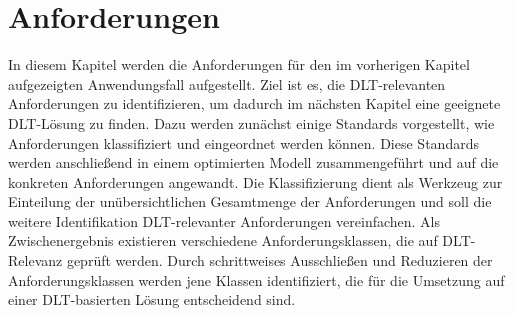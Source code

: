 \chapter{Anforderungen}
\label{ch:requirements}
In diesem Kapitel werden die Anforderungen für den im vorherigen Kapitel aufgezeigten Anwendungsfall aufgestellt. Ziel ist es, die \ac{DLT}-relevanten Anforderungen zu identifizieren, um dadurch im nächsten Kapitel eine geeignete \ac{DLT}-Lösung zu finden. Dazu werden zunächst einige Standards vorgestellt, wie Anforderungen klassifiziert und eingeordnet werden können. Diese Standards werden anschließend in einem optimierten Modell zusammengeführt und auf die konkreten Anforderungen angewandt. Die Klassifizierung dient als Werkzeug zur Einteilung der unübersichtlichen Gesamtmenge der Anforderungen und soll die weitere Identifikation \ac{DLT}-relevanter Anforderungen vereinfachen. Als Zwischenergebnis existieren verschiedene Anforderungsklassen, die auf \ac{DLT}-Relevanz geprüft werden. Durch schrittweises Ausschließen und Reduzieren der Anforderungsklassen werden jene Klassen identifiziert, die für die Umsetzung auf einer \ac{DLT}-basierten Lösung entscheidend sind.

%
%
